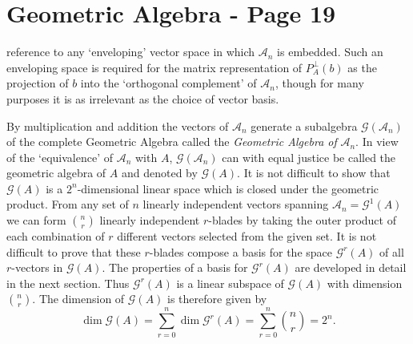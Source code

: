 \documentclass[fleqn]{scrartcl}
\numberwithin{equation}{section}
\begin{document}
\section*{Geometric Algebra - Page 19}

\noindent reference to any `enveloping' vector space in which \(\mathscr{A}_n\) is embedded. Such an enveloping space is required for the matrix representation of \(P_A^\perp(b)\) as the projection of \(b\) into the `orthogonal complement' of \(\mathscr{A}_n\), though for many purposes it is as irrelevant as the choice of vector basis.

\vspace{1em}
\noindent By multiplication and addition the vectors of \(\mathscr{A}_n\) generate a subalgebra \(\mathscr{G}(\mathscr{A}_n)\) of the complete Geometric Algebra called the \textit{Geometric Algebra of} \(\mathscr{A}_n\). In view of the `equivalence' of \(\mathscr{A}_n\) with \(A\), \(\mathscr{G}(\mathscr{A}_n)\) can with equal justice be called the geometric algebra of \(A\) and denoted by \(\mathscr{G}(A)\). It is not difficult to show that \(\mathscr{G}(A)\) is a \(2^n\)-dimensional linear space which is closed under the geometric product. From any set of \(n\) linearly independent vectors spanning \(\mathscr{A}_n = \mathscr{G}^1(A)\) we can form \(\binom{n}{r}\) linearly independent \(r\)-blades by taking the outer product of each combination of \(r\) different vectors selected from the given set. It is not difficult to prove that these \(r\)-blades compose a basis for the space \(\mathscr{G}^r(A)\) of all \(r\)-vectors in \(\mathscr{G}(A)\). The properties of a basis for \(\mathscr{G}^r(A)\) are developed in detail in the next section. Thus \(\mathscr{G}^r(A)\) is a linear subspace of \(\mathscr{G}(A)\) with dimension \(\binom{n}{r}\). The dimension of \(\mathscr{G}(A)\) is therefore given by
\[
\dim \mathscr{G}(A) = \sum_{r=0}^n \dim \mathscr{G}^r(A) = \sum_{r=0}^n \binom{n}{r} = 2^n.
\]
\end{document}
